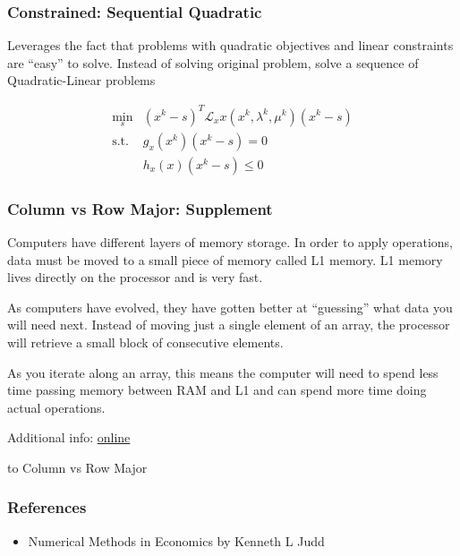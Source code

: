 \documentclass[10pt]{beamer}
\begin{document}
\begin{frame} \frametitle{Constrained: Sequential Quadratic}

  Leverages the fact that problems with quadratic objectives and linear constraints are ``easy'' to solve. Instead of solving original problem, solve a sequence of Quadratic-Linear problems

  \begin{align*}
    \min_s &(x^k - s)^T \mathcal{L}_xx(x^k, \lambda^k, \mu^k) (x^k - s) \\
    \text{s.t. } &g_x(x^k) (x^k - s) = 0 \\
    &h_x(x) (x^k - s) \leq 0
  \end{align*}

\end{frame}

\appendix

\begin{frame}[label=ColRowMajor_Supp] \frametitle{Column vs Row Major: Supplement}
  Computers have different layers of memory storage. In order to apply operations, data must be moved to a small piece of memory called L1 memory. L1 memory lives directly on the processor and is very fast.

  As computers have evolved, they have gotten better at ``guessing'' what data you will need next. Instead of moving just a single element of an array, the processor will retrieve a small block of consecutive elements.

  As you iterate along an array, this means the computer will need to spend less time passing memory between RAM and L1 and can spend more time doing actual operations.

  Additional info: \href{https://www.extremetech.com/extreme/188776-how-l1-and-l2-cpu-caches-work-and-why-theyre-an-essential-part-of-modern-chips}{online}

  \hyperlink{ColRowMajor}{} to Column vs Row Major
\end{frame}

\begin{frame} \frametitle{References}
  \begin{itemize}
    \item Numerical Methods in Economics by Kenneth L Judd
  \end{itemize}
\end{frame}
\end{document}
